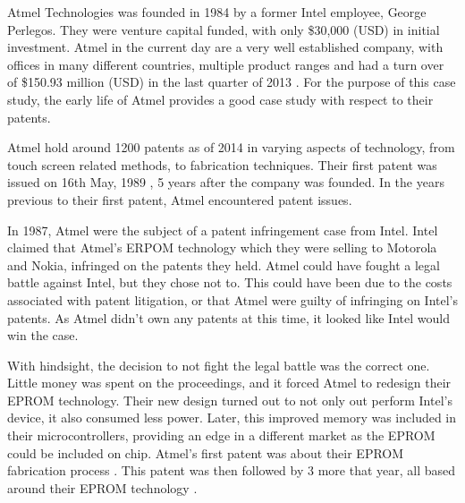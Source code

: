 
{}


Atmel Technologies was founded in 1984 by a former Intel employee, George Perlegos.
They were venture capital funded, with only \$30,000 (USD) in initial investment.
Atmel in the current day are a very well established company, with offices in many different countries, multiple product ranges and had a turn over of \$150.93 million (USD) in the last quarter of 2013 \cite{atmel:profit}.
For the purpose of this case study, the early life of Atmel provides a good case study with respect to their patents.


Atmel hold around 1200 patents as of 2014 \cite{atmelpatents} in varying aspects of technology, from touch screen related methods, to fabrication techniques.
Their first patent was issued on 16th May, 1989 \cite{atmel:eprompatent}, 5 years after the company was founded.
In the years previous to their first patent, Atmel encountered patent issues.

In 1987, Atmel were the subject of a patent infringement case from Intel.
Intel claimed that Atmel's ERPOM technology which they were selling to Motorola and Nokia, infringed on the patents they held.
Atmel could have fought a legal battle against Intel, but they chose not to. 
This could have been due to the costs associated with patent litigation, or that Atmel were guilty of infringing on Intel's patents.
As Atmel didn't own any patents at this time, it looked like Intel would win the case. 

With hindsight, the decision to not fight the legal battle was the correct one. 
Little money was spent on the proceedings, and it forced Atmel to redesign their EPROM technology.
Their new design turned out to not only out perform Intel's device, it also consumed less power.
Later, this improved memory was included in their microcontrollers, providing an edge in a different market as the EPROM could be included on chip.
Atmel's first patent was about their EPROM fabrication process \cite{atmel:eprompatent}.
This patent was then followed by 3 more that year, all based around their EPROM technology \cite{atmel:eprom1,atmel:eprom2,atmel:eprom3}.

